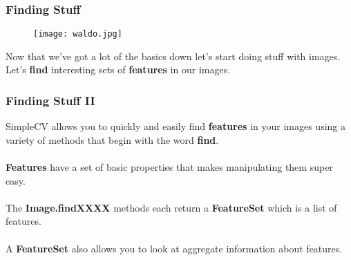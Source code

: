 \documentclass[compress]{beamer}
\begin{document}
\begin{frame}
  \frametitle{Finding Stuff}
 \begin{figure}
     \texttt{[image: waldo.jpg]}
 \end{figure}

Now that we've got a lot of the basics down let's start doing stuff
with images. Let's \textbf{find} interesting sets of \textbf{features} in our images.

\end{frame}
\begin{frame}
  \frametitle{Finding Stuff II}

SimpleCV allows you to quickly and easily find \textbf{features} in
your images using a variety of methods that begin with the word
\textbf{find}. 
\\~\\
\textbf{Features} have a set of basic properties that makes
manipulating them super easy.
\\~\\
The \textbf{Image.findXXXX} methods each return a \textbf{FeatureSet}
which is a list of features.
\\~\\
A \textbf{FeatureSet} also allows you to look at aggregate information
about features.
\end{frame}
\end{document}
